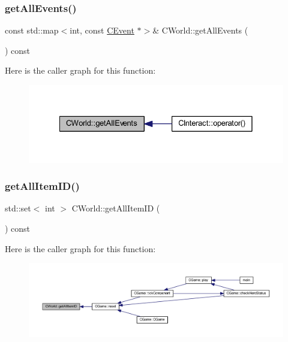 \subsubsection{\texorpdfstring{get\+All\+Events()}{getAllEvents()}}
{\footnotesize\ttfamily const std\+::map$<$int, const \mbox{\hyperlink{class_c_event}{C\+Event}} $\ast$$>$\& C\+World\+::get\+All\+Events (\begin{DoxyParamCaption}{ }\end{DoxyParamCaption}) const\hspace{0.3cm}{\ttfamily [inline]}}

Here is the caller graph for this function\+:\nopagebreak
\begin{figure}[H]
\begin{center}
\leavevmode
\includegraphics[width=328pt]{class_c_world_a325d979d0d2b15db1e3badec7201c960_icgraph}
\end{center}
\end{figure}
\mbox{\label{class_c_world_a1c10d5ec2514347fd3fe28f85b23db13}} 
\subsubsection{\texorpdfstring{get\+All\+Item\+I\+D()}{getAllItemID()}}
{\footnotesize\ttfamily std\+::set$<$ int $>$ C\+World\+::get\+All\+Item\+ID (\begin{DoxyParamCaption}{ }\end{DoxyParamCaption}) const}

Here is the caller graph for this function\+:\nopagebreak
\begin{figure}[H]
\begin{center}
\leavevmode
\includegraphics[width=350pt]{class_c_world_a1c10d5ec2514347fd3fe28f85b23db13_icgraph}
\end{center}
\end{figure}
\mbox{\label{class_c_world_a3c5750b369a9384ace4570c27da37386}} 
